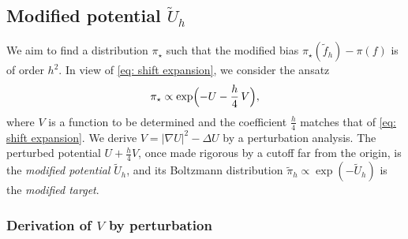 \documentclass{article}
\numberwithin{equation}{section}
\begin{document}
\subsection{Modified potential $\tilde U_h$}
\label{subsec: modified}

We aim to find a distribution $\pi_\star$ such that the modified bias $\pi_\star(\tilde f_h) - \pi(f)$ is of order $h^2$. In view of \eqref{eq: shift expansion}, we consider the ansatz
\begin{equation}
	\pi_\star \propto \exp\Bigl( - U - \frac h4\, V \Bigr) ,
	\label{eq: ansatz}
\end{equation}
where $V$ is a function to be determined and the coefficient $\frac h4$ matches that of \eqref{eq: shift expansion}. We derive $V = |\nabla U|^2 - \Delta U$ by a perturbation analysis. The perturbed potential $U + \frac h4 V$, once made rigorous by a cutoff far from the origin, is the \emph{modified potential} $\tilde U_h$, and its Boltzmann distribution $\tilde\pi_h \propto \exp(-\tilde U_h)$ is the \emph{modified target}.

\subsubsection*{Derivation of $V$ by perturbation}
\end{document}
